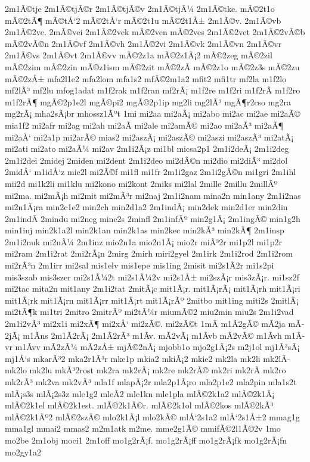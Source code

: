 {2m1Ã©tje
2m1Ã©tjÃ©r
2m1Ã©tjÃ©v
2m1Ã©tjÃ¼
2m1Ã©tke.
mÃ©2t1o
mÃ©2tÃ¶
mÃ©tÅ‘2
mÃ©2tÅ‘r
mÃ©2t1u
mÃ©2t1Å±
2m1Ã©v.
2m1Ã©vb
2m1Ã©2ve.
2mÃ©vei
2m1Ã©2vek
mÃ©2ven
mÃ©2ves
2m1Ã©2vet
2m1Ã©2vÃ©b
mÃ©2vÃ©n
2m1Ã©vf
2m1Ã©vh
2m1Ã©2vi
2m1Ã©vk
2m1Ã©vn
2m1Ã©vr
2m1Ã©vs
2m1Ã©vt
2m1Ã©vv
mÃ©2z1a
mÃ©2z1Ã¡2
mÃ©2zeg
mÃ©2zil
mÃ©2zim
mÃ©2zin
mÃ©z1ism
mÃ©2zit
mÃ©2zÃ­
mÃ©2z1o
mÃ©2z3s
mÃ©2zu
mÃ©2zÅ±
mfa2l1e2
mfa2lom
mfa1s2
mfÃ©2m1a2
mfit2
mfi1tr
mf2la
m1f2lo
mf2lÃ³
mf2lu
mfog1adat
m1f2rak
m1f2ran
mf2rÃ¡
m1f2re
m1f2ri
m1f2rÃ­
m1f2ro
m1f2rÃ¶
mgÃ©2p1e2l
mgÃ©pi2
mgÃ©2p1ip
mg2li
mg2lÃ³
mgÃ¶r2cso
mg2ra
mg2rÃ¡
mha2sÃ¡br
mhossz1Ãºt
1mi
mi2aa
mi2aÃ¡
mi2abo
mi2ac
mi2ae
mi2aÃ©
mia1f2
mi2afr
mi2ag
mi2ah
mi2aÃ­
mi2ale
mi2amÃ©
mi2ao
mi2aÃ³
mi2aÃ¶
mi2aÅ‘
mi2a1p
mi2arÃ©
mias2
mi2aszÃ¡
mi2aszÃ©
mi2aszi
mi2aszÃ³
mi2atÃ¡
mi2ati
mi2ato
mi2aÃ¼
mi2av
2m1i2Ã¡z
mi1bl
micsa2p1
2m1i2deÃ¡
2m1i2deg
2m1i2dei
2midej
2miden
mi2dent
2m1i2deo
mi2dÃ©n
mi2dio
mi2diÃ³
mi2dol
2midÅ‘
m1idÅ‘z
mie2l
mi2Ã©f
mi1fl
mi1fr
2m1i2gaz
2m1i2gÃ©n
mi1gri
2m1ihl
mii2d
mi1k2li
mi1klu
mi2kono
mi2kont
2miks
mi2lal
2mille
2millu
2millÃº
mi2ma.
mi2mÃ¡h
mi2mit
mi2mÃ³r
mi2naj
2m1i2nam
mina2n
min1any
2m1i2nas
mi2n1Ã¡ra
min2c1e2
min2ch
min2d1a2
2m1indÃ¡
min2dek
min2d1er
min2din
2m1indÃ­
2mindu
mi2neg
mine2s
2minfl
2m1infÃº
min2g1Ã¡
2m1ingÃ©
min1g2h
min1inj
min2k1a2l
min2k1an
min2k1as
min2kec
min2kÃ³
min2kÃ¶
2m1insp
2m1i2nuk
mi2nÃ¼
2m1inz
mio2n1a
mio2n1Ã¡
mio2r
miÃ³2r
mi1p2l
mi1p2r
mi2ram
2m1i2rat
2mi2rÃ¡n
2mirg
2mirh
miri2gyel
2m1irk
2m1i2rod
2m1i2rom
mi2rÃ³n
2m1irr
mi2sal
mis1elv
mis1epe
mis1ing
2misit
mi2s1Ã­2r
mi1s2pi
mis3szab
mis3szer
mi2s1Ã¼2t
mi2s1Ã¼2v
mi2s1Å±
mi2szÃ¡r
mis3zÃ¡r.
mi1sz2f
mi2tac
mita2n
mit1any
2m1i2tat
2mitÃ¡c
mit1Ã¡r.
mit1Ã¡rÃ¡
mit1Ã¡rh
mit1Ã¡ri
mit1Ã¡rk
mit1Ã¡rn
mit1Ã¡rr
mit1Ã¡rt
mit1Ã¡rÃº
2mitbo
mit1ing
miti2s
2mitlÃ¡
mi2tÃ¶k
mi1tri
2mitro
2mitrÃº
mi2tÃ¼r
miumÃ©2
miu2min
miu2s
2m1i2vad
2m1i2vÃ³
mi2x1i
mi2xÃ¶
mi2xÅ‘
mi2zÃ©.
mi2zÃ©t
1mÃ­
m1Ã­2gÃ©
mÃ­2ja
mÃ­2jÃ¡
m1Ã­ns
2m1Ã­2rÃ¡
2m1Ã­2rÃ³
m1Ã­v.
mÃ­2vÃ¡
m1Ã­vb
mÃ­2vÃ©
m1Ã­vh
m1Ã­vr
m1Ã­vv
mÃ­2zÃ¼
mÃ­2zÅ±
mjÃ©2nÃ¡
mjobb1o
mjo2g1Ã¡2s
m2j1ol
mj1Ã³sÃ¡
mj1Å‘s
mkarÃ³2
mka2r1Ã³r
mke1p
mkia2
mkiÃ¡2
mkie2
mk2la
mk2li
mk2lÃ­
mk2lo
mk2lu
mkÃ³2rost
mk2ra
mk2rÃ¡
mk2re
mk2rÃ©
mk2ri
mk2rÃ­
mk2ro
mk2rÃ³
mk2va
mk2vÃ³
mla1f
mlapÃ¡2r
mla2p1Ã¡ro
mla2p1e2
mla2pin
mla1s2t
mlÃ¡s3s
mlÃ¡2s3z
mle1g2
mleÃ­2
mle1kn
mle1pla
mlÃ©2k1a2
mlÃ©2k1Ã¡
mlÃ©2k1el
mlÃ©2k1est.
mlÃ©2k1Ã©r.
mlÃ©2k1ol
mlÃ©2kos
mlÃ©2kÃ³
mlÃ©2k1Ãº2
mlÃ©2szÃ©
mlo2k1Ã¡l
mlo2kÃ©
mlÅ‘2s1a2
mlÅ‘2s1Å±2
mmag1g
mma1gl
mmai2
mmas2
m2m1atk
m2me.
mme2g1Ã©
mmifÃ©2l1Ã©2v
1mo
mo2be
2m1obj
moci1
2m1off
mo1g2rÃ¡f.
mo1g2rÃ¡ff
mo1g2rÃ¡fk
mo1g2rÃ¡fn
mo2gy1a2
}
